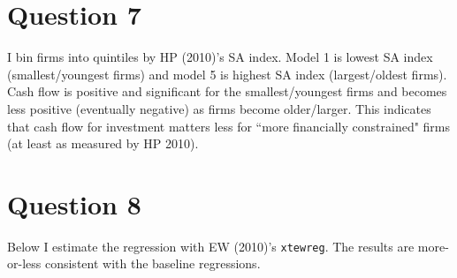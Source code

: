 \documentclass{article}
\begin{document}
\bigskip

\begin{center}

\end{center}

\bigskip


\section{Question 7}

I bin firms into quintiles by HP (2010)'s SA index. Model 1 is lowest SA index (smallest/youngest firms) and model 5 is highest SA index (largest/oldest firms).  Cash flow is positive and significant for the smallest/youngest firms and becomes less positive (eventually negative) as firms become older/larger.  This indicates that cash flow for investment matters less for ``more financially constrained" firms (at least as measured by HP 2010).

\bigskip

\begin{center}

\end{center}

\bigskip

\section{Question 8}

Below I estimate the regression with EW (2010)'s \texttt{xtewreg}.  The results are more-or-less consistent with the baseline regressions.

\bigskip

\begin{center}

\end{center}
\end{document}
